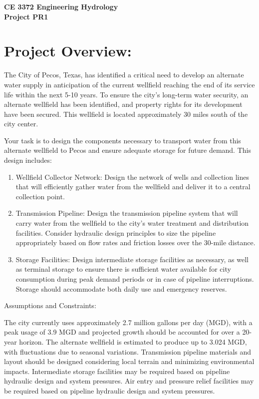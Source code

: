 \documentclass[12pt]{article}
\begin{document}
\begin{center}
{\textbf{{ CE 3372 Engineering Hydrology} \\ {Project PR1}}}
\end{center}

\section*{Project Overview:}
The City of Pecos, Texas, has identified a critical need to develop an alternate water supply in anticipation of the current wellfield reaching the end of its service life within the next 5-10 years. To ensure the city's long-term water security, an alternate wellfield has been identified, and property rights for its development have been secured. This wellfield is located approximately 30 miles south of the city center.

Your task is to design the components necessary to transport water from this alternate wellfield to Pecos and ensure adequate storage for future demand. This design includes:

\begin{enumerate}
\item Wellfield Collector Network: Design the network of wells and collection lines that will efficiently gather water from the wellfield and deliver it to a central collection point.
\item Transmission Pipeline: Design the transmission pipeline system that will carry water from the wellfield to the city’s water treatment and distribution facilities. Consider hydraulic design principles to size the pipeline appropriately based on flow rates and friction losses over the 30-mile distance.
\item Storage Facilities: Design intermediate storage facilities as necessary, as well as terminal storage to ensure there is sufficient water available for city consumption during peak demand periods or in case of pipeline interruptions. Storage should accommodate both daily use and emergency reserves.
\end{enumerate}

Assumptions and Constraints:

    The city currently uses approximately 2.7 million gallons per day (MGD), with a peak usage of 3.9 MGD and projected growth should be accounted for over a 20-year horizon.
    The alternate wellfield is estimated to produce up to 3.024 MGD, with fluctuations due to seasonal variations.
    Transmission pipeline materials and layout should be designed considering local terrain and minimizing environmental impacts.
    Intermediate storage facilities may be required based on pipeline hydraulic design and system pressures.
    Air entry and pressure relief facilities may be required based on pipeline hydraulic design and system pressures.
\end{document}
